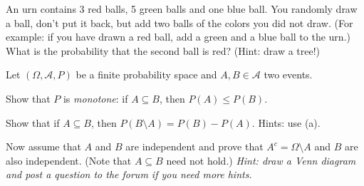 \documentclass[a4paper,10pt,landscape,twocolumn]{scrartcl}
\begin{document}

\begin{exercise}
  An urn contains 3 red balls, 5 green balls and one blue ball. You randomly
  draw a ball, don't put it back, but add two balls of the colors you did not
  draw. (For example: if you have drawn a red ball, add a green and a blue ball
  to the urn.) What is the probability that the second ball is red? (Hint: draw
  a tree!)
\end{exercise}


\begin{exercise}
  Let $(\Omega, \mathcal{A}, P)$ be a finite probability space and $A, B\in
  \mathcal A$ two events.
  
  \begin{subex}[1pt]
    Show that $P$ is \emph{monotone}: if $A \subseteq B$, then $P(A) \le P(B)$.
  \end{subex}

  \begin{subex}[1pt]
    Show that if $A \subseteq B$, then $P(B \setminus A) = P(B) - P(A)$. Hints:
    use (a).
  \end{subex}

  \begin{subex}[1pt]
    Now assume that $A$ and $B$ are independent and prove that $A^c = \Omega
    \setminus A$ and $B$ are also independent. (Note that $A\subseteq B$
    need not hold.) \emph{Hint: draw a Venn diagram and post a question to the
    forum if you need more hints.}
  \end{subex}
\end{exercise}
\end{document}
